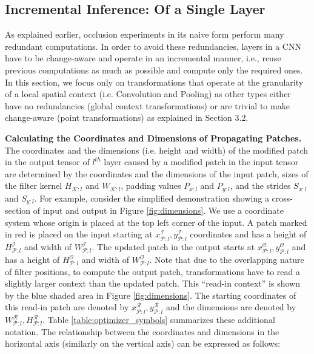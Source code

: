 \subsection{Incremental Inference: Of a Single Layer}\label{sec:inc_computation}
As explained earlier, occlusion experiments in its naive form perform many redundant computations.
In order to avoid these redundancies, layers in a CNN have to be change-aware and operate in an incremental manner, i.e., reuse previous computations as much as possible and compute only the required ones.
In this section, we focus only on transformations that operate at the granularity of a local spatial context (i.e. Convolution and Pooling) as other types either have no redundancies (global context transformations) or are trivial to make change-aware (point transformations) as explained in Section 3.2.

\vspace{2mm}
\noindent \textbf{Calculating the Coordinates and Dimensions of Propagating Patches.} The coordinates and the dimensions (i.e. height and width) of the modified patch in the output tensor of $l^{th}$ layer caused by a modified patch in the input tensor are determined by the coordinates and the dimensions of the input patch, sizes of the filter kernel $H_{\mathcal{K}:l}$ and $W_{\mathcal{K}:l}$, padding values $P_{x:l}$ and $P_{y:l}$, and the strides $S_{x:l}$ and $S_{y:l}$.
For example, consider the simplified demonstration showing a cross-section of input and output in Figure \ref{fig:dimensions}.
We use a coordinate system whose origin is placed at the top left corner of the input.
A patch marked in red is placed on the input starting at $x^\mathcal{I}_{\mathcal{P}:l}, y^\mathcal{I}_{\mathcal{P}:l}$ coordinates and has a height of $H^\mathcal{I}_{\mathcal{P}:l}$ and width of $W^\mathcal{I}_{\mathcal{P}:l}$.
The updated patch in the output starts at $x^\mathcal{O}_{\mathcal{P}:l}, y^\mathcal{O}_{\mathcal{P}:l}$ and has a height of $H^\mathcal{O}_{\mathcal{P}:l}$ and width of $W^\mathcal{O}_{\mathcal{P}:l}$.
Note that due to the overlapping nature of filter positions, to compute the output patch, transformations have to read a slightly larger context than the updated patch.
This ``read-in context'' is shown by the blue shaded area in Figure \ref{fig:dimensions}.
The starting coordinates of this read-in patch are denoted by $x^\mathcal{R}_{\mathcal{P}:l}, y^\mathcal{R}_{\mathcal{P}:l}$ and the dimensions are denoted by $W^\mathcal{R}_{\mathcal{P}:l}, H^\mathcal{R}_{\mathcal{P}:l}$.
Table \ref{table:optimizer_symbols} summarizes these additional notation.
The relationship between the coordinates and dimensions in the horizontal axis (similarly on the vertical axis) can be expressed as follows:


